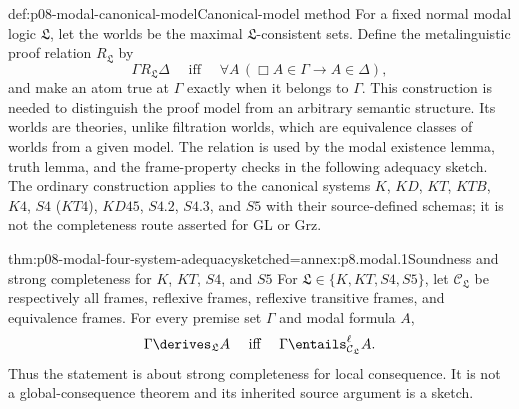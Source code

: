 \begin{hbmethod}{def:p08-modal-canonical-model}{Canonical-model method}
For a fixed normal modal logic \(\mathfrak L\), let the worlds be the maximal
\(\mathfrak L\)-consistent sets.  Define the metalinguistic proof relation
\(R_{\mathfrak L}\) by
\[
 \Gamma R_{\mathfrak L}\Delta
 \quad\text{ iff }\quad
 \forall A\,(\Box A\in\Gamma\to A\in\Delta),
\]
and make an atom true at \(\Gamma\) exactly when it belongs to \(\Gamma\).
This construction is needed to distinguish the proof model from an arbitrary
semantic structure.  Its worlds are theories, unlike filtration worlds, which
are equivalence classes of worlds from a given model.  The relation is used by
the modal existence lemma, truth lemma, and the frame-property checks in the
following adequacy sketch.  The ordinary construction applies to the canonical
systems \(K\), \(KD\), \(KT\), \(KTB\), \(K4\), \(S4\) (\(KT4\)),
\(KD45\), \(S4.2\), \(S4.3\), and \(S5\) with their source-defined
schemas; it is not the completeness route asserted for GL or Grz.
\end{hbmethod}

\begin{hbtheorem}{thm:p08-modal-four-system-adequacy}{sketched=annex:p8.modal.1}{Soundness and strong completeness for \(K\), \(KT\), \(S4\), and \(S5\)}
For \(\mathfrak L\in\{K,KT,S4,S5\}\), let
\(\mathcal C_{\mathfrak L}\) be respectively all frames, reflexive frames,
reflexive transitive frames, and equivalence frames.  For every premise set
\(\Gamma\) and modal formula \(A\),
\[
 \Gamma\derives_{\mathfrak L}A
 \quad\text{ iff }\quad
 \Gamma\entails^{\ell}_{\mathcal C_{\mathfrak L}}A.
\]
Thus the statement is about strong completeness for local consequence.  It is
not a global-consequence theorem and its inherited source argument is a sketch.
\end{hbtheorem}

